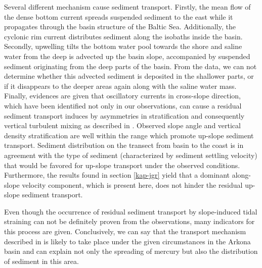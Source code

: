 Several different mechanism cause sediment transport. Firstly, the mean flow of 
the dense bottom current spreads suspended sediment to the east while it 
propagates through the basin structure of the Baltic Sea. Additionally, the 
cyclonic rim current distributes sediment along the isobaths inside the basin. 
Secondly, upwelling tilts the bottom water pool towards the shore and saline 
water from the deep is advected up the basin slope, accompanied by 
suspended sediment originating from the deep parts of the basin. From the data, 
we can not determine whether this advected sediment is deposited in the 
shallower parts, or if it disappears to the deeper areas again along with the 
saline water mass. Finally, evidences are given that oscillatory currents 
in cross-slope direction, which have been identified not only in our 
observations, can cause a residual sediment transport induces by asymmetries in 
stratification and consequently vertical turbulent mixing as described in 
\cite{schulzumlauf2016}. Observed slope angle and vertical density 
stratification are well within the range which promote up-slope sediment 
transport. Sediment distribution on the transect from basin to the coast is in 
agreement with the type of sediment (characterized by sediment settling 
velocity) that would be favored for up-slope transport under the observed 
conditions. Furthermore, the results found in section \ref{kap-jgr} yield that 
a dominant along-slope velocity component, which is present here, does not 
hinder the residual up-slope sediment transport.

Even though the occurrence of residual sediment transport by slope-induced tidal 
straining can not be definitely proven from the observations, many indicators 
for this process are given. Conclusively, we can say that the transport 
mechanism described in \cite{schulzumlauf2016} is likely to take place under 
the given circumstances in the Arkona basin and can explain not only the 
spreading of mercury but also the distribution of sediment in this area.